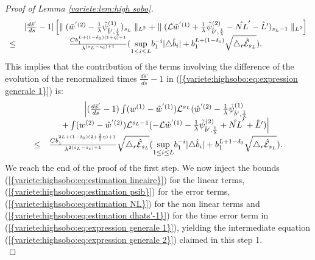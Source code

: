 \documentclass[11pt,a4paper,reqno]{amsart}
\theoremstyle{remark}
\numberwithin{equation}{section}
\begin{document}
\begin{proof}[Proof of Lemma \ref{variete:lem:high sobo}]
\begin{equation}
\begin{array}{r c l}
&|\frac{d\hat{s}'}{ds}-1|\left[ \parallel (\hat{w}^{'(2)} -\frac{1}{\lambda}\tilde{\psi}^{(1)}_{\hat{b}',\frac{1}{\lambda}})_{s_L}\parallel_{L^2} +\parallel (\mathcal{L}\hat{w}^{'(1)}+\frac{1}{\lambda}\tilde{\psi}_{\hat{b}',\frac{1}{\lambda}}^{(2)}-\hat{NL}'-\hat{L}')_{s_L-1}  \parallel_{L^2} \right]\\
\leq & \frac{Cb_1^{L+(1-\delta_0)(1+\eta)+1}}{\lambda^{(s_L-s_c)+1}}(\underset{1\leq i \leq L}{\text{sup}}b_1^{-i}|\triangle \hat{b}_i|+b_1^{L+(1-\delta_0)} \sqrt{\triangle_r \hat{\mathcal{E}}_{s_L}} ).
\end{array}
\end{equation}
This implies that the contribution of the terms involving the difference of the evolution of the renormalized times $\frac{d\hat{s}'}{ds}-1$ in {{\rm (\ref{{variete:highsobo:eq:expression generale 1}})}} is:
\begin{equation} \label{variete:highsobo:eq:estimation dhats'-1}
\begin{array}{r c l}
&\Bigl{|} (\frac{d\hat{s}'}{ds}-1)\int (w^{(1)}-\hat{w}^{'(1)})\mathcal{L}^{s_L} (\hat{w}^{'(2)} -\frac{1}{\lambda}\tilde{\psi}^{(1)}_{\hat{b}',\frac{1}{\lambda}}\\
&+\int (w^{(2)}-\hat{w}^{'(2)})\mathcal{L}^{s_L-1}(-\mathcal{L}\hat{w}^{'(1)}-\frac{1}{\lambda}\tilde{\psi}_{\hat{b}',\frac{1}{\lambda}}^{(2)}+\hat{NL}'+\hat{L}')  \Bigr{|} \\
\leq & \frac{Cb_1^{2L+(1-\delta_0)(2+\frac{3}{2}\eta)+1}}{\lambda^{2(s_L-s_c)+1}}\sqrt{\triangle_r \hat{\mathcal{E}}_{s_L}}(\underset{1\leq i \leq L}{\text{sup}}b_1^{-i}|\triangle \hat{b}_i|+b_1^{L+1-\delta_0} \sqrt{\triangle_r \hat{\mathcal{E}}_{s_L}} ).
\end{array}
\end{equation}
We reach the end of the proof of the first step. We now inject the bounds {{\rm (\ref{{variete:highsobo:eq:estimation lineaire}})}} for the linear terms, {{\rm (\ref{{variete:highsobo:eq:estimation psib}})}} for the error terms, {{\rm (\ref{{variete:highsobo:eq:estimation NL}})}} for the non linear terms and {{\rm (\ref{{variete:highsobo:eq:estimation dhats'-1}})}} for the time error term in {{\rm (\ref{{variete:highsobo:eq:expression generale 1}})}}, yielding the intermediate equation {{\rm (\ref{{variete:highsobo:eq:expression generale 2}})}} claimed in this step 1.\\


\end{proof}
\end{document}
